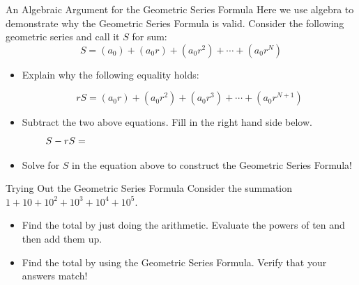 \begin{exercise}{An Algebraic Argument for the Geometric Series Formula \Coffeecup \Coffeecup \Coffeecup}
Here we use algebra to demonstrate why the Geometric Series Formula is valid.  
Consider the following geometric series and call it $S$ for sum:  $$S=\left(a_0\right)+\left(a_0r\right)+\left(a_0r^2\right)+\cdots+\left(a_0r^N\right)$$
\begin{itemize}

\item Explain why the following equality holds:

$$ rS=\left(a_0r\right)+\left(a_0r^2\right)+\left(a_0r^3\right)+\cdots+\left(a_0r^{N+1}\right)$$

\item Subtract the two above equations.  Fill in the right hand side below.
$$S-rS=\hspace{3.5in} $$
\item Solve for $S$ in the equation above to construct the Geometric Series Formula!
\vspace*{.5in}
\end{itemize}
\end{exercise}

\begin{exercise}{Trying Out the Geometric Series Formula \Coffeecup }
Consider the summation $1+10+10^2+10^3+10^4+10^5. $
\begin{itemize}
\item Find the total by just doing the arithmetic.  Evaluate the powers of ten and then add them up. 

\vspace*{.5in}
\item Find the total by using the Geometric Series Formula.  Verify that your answers match! 

\vspace*{.5in}

\end{itemize}
\end{exercise}

